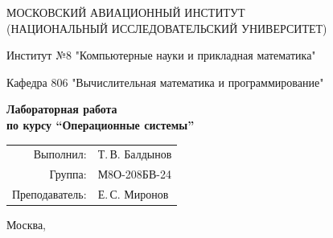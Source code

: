 \begin{titlepage}
\begin{center}
\large
МОСКОВСКИЙ АВИАЦИОННЫЙ ИНСТИТУТ\\ (НАЦИОНАЛЬНЫЙ ИССЛЕДОВАТЕЛЬСКИЙ УНИВЕРСИТЕТ)

\vspace{20pt}

Институт №8 "Компьютерные науки и прикладная математика"

Кафедра 806 "Вычислительная математика и программирование"
\end{center}

\vspace{60pt}

\begin{center}
\bfseries
\large
Лабораторная работа  \\по курсу \enquote{Операционные системы}

\vspace{54pt}

\end{center}

\vfill

\begin{flushright}
\large
\begin{tabular}{rl}
Выполнил: & Т.\,В. Балдынов \\
Группа: & М8О-208БВ-24 \\
Преподаватель: & Е.\,С. Миронов \\
\end{tabular}
\end{flushright}

\vspace{92pt}

\begin{center}
\large
Москва, \the\year
\end{center}
\end{titlepage}

\pagebreak